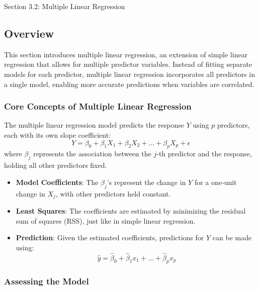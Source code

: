 \begin{notes}{Section 3.2: Multiple Linear Regression}
    \subsection*{Overview}

    This section introduces multiple linear regression, an extension of simple linear regression that allows for multiple predictor variables. Instead of fitting separate models for each predictor, 
    multiple linear regression incorporates all predictors in a single model, enabling more accurate predictions when variables are correlated.
    
    \subsubsection*{Core Concepts of Multiple Linear Regression}
    
    The multiple linear regression model predicts the response $Y$ using $p$ predictors, each with its own slope coefficient:
    \[
    Y = \beta_0 + \beta_1 X_1 + \beta_2 X_2 + \dots + \beta_p X_p + \epsilon
    \]
    where $\beta_j$ represents the association between the $j$-th predictor and the response, holding all other predictors fixed.
    
    \begin{highlight}
        \begin{itemize}
            \item \textbf{Model Coefficients}: The $\beta_j$'s represent the change in $Y$ for a one-unit change in $X_j$, with other predictors held constant.
            \item \textbf{Least Squares}: The coefficients are estimated by minimizing the residual sum of squares (RSS), just like in simple linear regression.
            \item \textbf{Prediction}: Given the estimated coefficients, predictions for $Y$ can be made using:
            \[
            \hat{y} = \hat{\beta}_0 + \hat{\beta}_1 x_1 + \dots + \hat{\beta}_p x_p
            \]
        \end{itemize}
    \end{highlight}
    
    \subsubsection*{Assessing the Model}
    

\end{notes}
